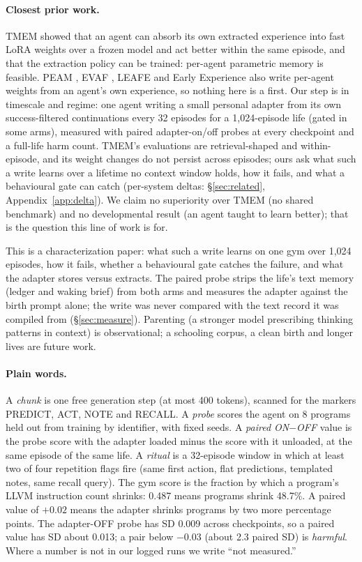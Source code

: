 \documentclass{article}
\newcommand{\onoff}{ON$-$OFF}
\begin{document}
\paragraph{Closest prior work.} TMEM \citep{ren2026tmem} showed that an agent can absorb its own extracted experience into fast LoRA weights over a frozen model and act better within the same episode, and that the extraction policy can be trained: per-agent parametric memory is feasible. PEAM \citep{guo2026peam}, EVAF \citep{han2026evaf}, LEAFE \citep{ge2026leafe} and Early Experience \citep{zhang2025earlyexperience} also write per-agent weights from an agent's own experience, so nothing here is a first. Our step is in timescale and regime: one agent writing a small personal adapter from its own success-filtered continuations every 32 episodes for a 1{,}024-episode life (gated in some arms), measured with paired adapter-on/off probes at every checkpoint and a full-life harm count. TMEM's evaluations are retrieval-shaped and within-episode, and its weight changes do not persist across episodes; ours ask what such a write learns over a lifetime no context window holds, how it fails, and what a behavioural gate can catch (per-system deltas: \S\ref{sec:related}, Appendix~\ref{app:delta}). We claim no superiority over TMEM (no shared benchmark) and no developmental result (an agent taught to learn better); that is the question this line of work is for.

This is a characterization paper: what such a write learns on one gym over 1{,}024 episodes, how it fails, whether a behavioural gate catches the failure, and what the adapter stores versus extracts. The paired probe strips the life's text memory (ledger and waking brief) from both arms and measures the adapter against the birth prompt alone; the write was never compared with the text record it was compiled from (\S\ref{sec:measure}). Parenting (a stronger model prescribing thinking patterns in context) is observational; a schooling corpus, a clean birth and longer lives are future work.

\paragraph{Plain words.} A \emph{chunk} is one free generation step (at most 400 tokens), scanned for the markers PREDICT, ACT, NOTE and RECALL. A \emph{probe} scores the agent on 8 programs held out from training by identifier, with fixed seeds. A \emph{paired \onoff{}} value is the probe score with the adapter loaded minus the score with it unloaded, at the same episode of the same life. A \emph{ritual} is a 32-episode window in which at least two of four repetition flags fire (same first action, flat predictions, templated notes, same recall query). The gym score is the fraction by which a program's LLVM instruction count shrinks: 0.487 means programs shrink 48.7\%. A paired value of $+0.02$ means the adapter shrinks programs by two more percentage points. The adapter-OFF probe has SD 0.009 across checkpoints, so a paired value has SD about 0.013; a pair below $-0.03$ (about 2.3 paired SD) is \emph{harmful}. Where a number is not in our logged runs we write ``not measured.''
\end{document}
